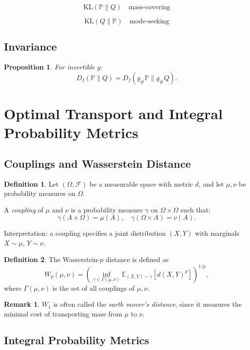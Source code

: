 \documentclass[12pt,oneside]{book}
\numberwithin{equation}{section}
\theoremstyle{definition}
\newtheorem{definition}{Definition}[section]
\newtheorem{remark}{Remark}[section]
\theoremstyle{plain}
\newtheorem{proposition}{Proposition}[section]
\theoremstyle{remark}
\newcommand{\E}{\mathbb{E}}
\newcommand{\Prob}{\mathbb{P}}
\begin{document}
\[
\mathrm{KL}(\Prob \| Q) \quad \text{mass-covering}
\]

\[
\mathrm{KL}(Q \| \Prob) \quad \text{mode-seeking}
\]


\subsection{Invariance}

\begin{proposition}
For invertible $g$:
\[
D_f(\Prob \| Q)
=
D_f(g_\#\Prob \| g_\# Q).
\]
\end{proposition}

\section{Optimal Transport and Integral Probability Metrics}

\subsection{Couplings and Wasserstein Distance}

\begin{definition}
Let $(\Omega,\mathcal{F})$ be a measurable space with metric $d$, and let $\mu,\nu$ be probability measures on $\Omega$.

A \emph{coupling} of $\mu$ and $\nu$ is a probability measure $\gamma$ on $\Omega \times \Omega$ such that:
\[
\gamma(A \times \Omega) = \mu(A), \quad
\gamma(\Omega \times A) = \nu(A).
\]
\end{definition}

Interpretation: a coupling specifies a joint distribution $(X,Y)$ with marginals $X \sim \mu$, $Y \sim \nu$.

\begin{definition}
The Wasserstein-$p$ distance is defined as
\[
W_p(\mu,\nu)
=
\left(
\inf_{\gamma \in \Gamma(\mu,\nu)}
\E_{(X,Y)\sim \gamma}[d(X,Y)^p]
\right)^{1/p},
\]
where $\Gamma(\mu,\nu)$ is the set of all couplings of $\mu,\nu$.
\end{definition}

\begin{remark}
$W_1$ is often called the \emph{earth mover's distance}, since it measures the minimal cost of transporting mass from $\mu$ to $\nu$.
\end{remark}


\subsection{Integral Probability Metrics}
\end{document}
